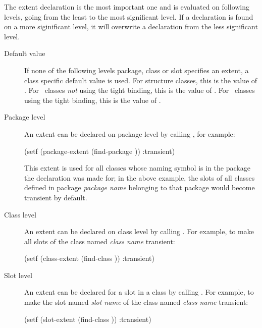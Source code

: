 The extent declaration is the most important one and is evaluated on
following levels, going from the least to the most significant
level. If a declaration is found on a more siginificant level, it will
overwrite a declaration from the less significant level.
\begin{description}

\item[Default value] If none of the following levels package, class or
  slot specifies an extent, a class specific default value is used.
  For structure classes, this is the value of
  . For \clos\ classes
  \emph{not} using the tight binding, this is the value of
  . For \clos\ classes using the
  tight binding, this is the value of
  .

\item[Package level] An extent can be declared on package level by
  calling , for example:
\begin{IndentedCompactCode}
(setf (package-extent (find-package )) :transient)
\end{IndentedCompactCode}

  This extent is used for all classes whose naming symbol is in the
  package the declaration was made for; in the above example, the
  slots of all classes defined in package \emph{\lt{}package name\gt}
  belonging to that package would become transient by default.

\item[Class level] An extent can be declared on class level by calling
  . For example, to make all slots of the
  class named \emph{\lt{}class name\gt} transient:
\begin{IndentedCompactCode}
(setf (class-extent (find-class )) :transient)
\end{IndentedCompactCode}

\item[Slot level] An extent can be declared for a slot in a class
  by calling . For example, to make
  the slot named \emph{\lt{}slot name\gt} of the class named
  \emph{\lt{}class name\gt} transient:
\begin{IndentedCompactCode}
(setf (slot-extent  (find-class )) :transient)
\end{IndentedCompactCode}
\end{description}

